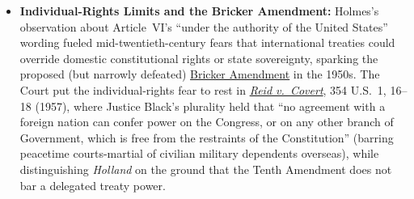 \documentclass[12pt]{article}
\begin{document}
\begin{itemize}

\item \textbf{Individual-Rights Limits and the Bricker Amendment:} Holmes's observation about Article~VI's ``under the authority of the United States'' wording fueled mid-twentieth-century fears that international treaties could override domestic constitutional rights or state sovereignty, sparking the proposed (but narrowly defeated) \href{https://www.law.cornell.edu/constitution-conan/article-2/section-2/clause-2/congressional-implementation-of-treaties}{Bricker Amendment} in the 1950s. The Court put the individual-rights fear to rest in \href{https://supreme.justia.com/cases/federal/us/354/1/}{\textit{Reid v.\ Covert}}, 354 U.S.\ 1, 16--18 (1957), where Justice Black's plurality held that ``no agreement with a foreign nation can confer power on the Congress, or on any other branch of Government, which is free from the restraints of the Constitution'' (barring peacetime courts-martial of civilian military dependents overseas), while distinguishing \textit{Holland} on the ground that the Tenth Amendment does not bar a delegated treaty power.


\end{itemize}
\end{document}
